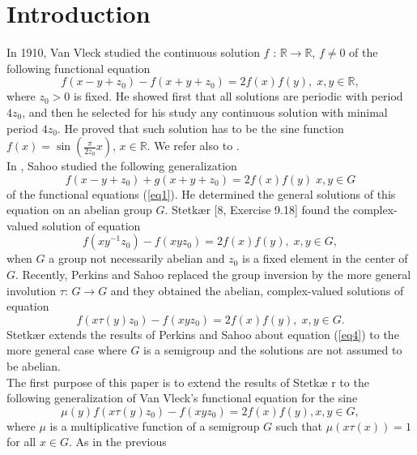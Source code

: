 \documentclass[12pt]{amsart}
\theoremstyle{definition}
\theoremstyle{remark}
\numberwithin{equation}{section}
\begin{document}
\section{Introduction}
In 1910, Van Vleck \cite{V1,V2} studied the continuous solution $f$
: $\mathbb{R} \longrightarrow \mathbb{R}$, $f\neq 0$ of the
following functional equation
\begin{equation}\label{eq1}
f(x - y + z_0)-f(x + y + z_0) = 2f(x)f(y),\;x,y \in
\mathbb{R},\end{equation} where $z_0>0$ is fixed. He showed first
that all solutions are periodic with period $4z_0$, and then he
selected for his study any continuous solution with minimal period
$4z_0$. He proved that such solution has to be the sine function
$f(x)=\sin(\frac{\pi}{2z_0}x)$, $x\in \mathbb{R}$. We refer also to \cite{K}.\\
In \cite{S}, Sahoo studied the following generalization
 \begin{equation}\label{eq2}
 f(x - y +z_0) + g(x + y + z_0) = 2f(x)f(y)\; x,y\in G\end{equation}
 of the functional equations (\ref{eq1}). He determined the general
solutions of this equation on an abelian group $G$. Stetk\ae r [8,
Exercise 9.18] found the complex-valued solution of equation
\begin{equation}\label{eq3} f(xy^{-1}z_0)-f(xyz_0) =
2f(x)f(y),\;x,y \in G,\end{equation}  when $G$ a group not
necessarily abelian and $z_0$ is a fixed element in the center of
$G$. Recently, Perkins and Sahoo \cite{P} replaced the group
inversion by the more general involution $\tau$: $G\longrightarrow
G$ and they obtained the abelian, complex-valued solutions of
equation
\begin{equation}\label{eq4} f(x\tau(y)z_0)-f(xyz_0) = 2f(x)f(y),\;x,y
\in G.\end{equation}  Stetk\ae r \cite{St3} extends the results of
Perkins and Sahoo \cite{P} about equation (\ref{eq4}) to the more
general case where $G$ is a semigroup and the solutions are not
assumed to be abelian.\\
The first purpose of this paper is to extend the results of Stetk\ae
r \cite{St3} to the following generalization of Van Vleck's
functional equation for the sine
\begin{equation}\label{eq5}
\mu(y)f(x\tau(y)z_0)-f(xyz_0) =2f(x)f(y), x,y\in G,\end{equation}
where $\mu$ is a  multiplicative function of a semigroup $G$ such
that $\mu(x\tau(x))=1$ for all $x\in G$.   As in the previous
\end{document}
